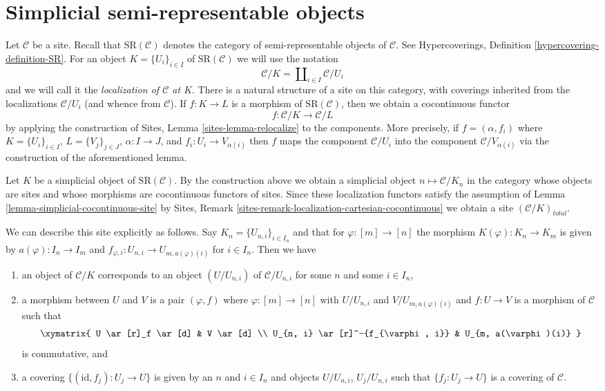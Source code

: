 \section{Simplicial semi-representable objects}
\label{section-semi-representable}

\noindent
Let $\mathcal{C}$ be a site. Recall that $\text{SR}(\mathcal{C})$
denotes the category of semi-representable objects of $\mathcal{C}$.
See Hypercoverings, Definition \ref{hypercovering-definition-SR}.
For an object $K = \{U_i\}_{i \in I}$ of $\text{SR}(\mathcal{C})$
we will use the notation
$$
\mathcal{C}/K = \coprod\nolimits_{i \in I} \mathcal{C}/U_i
$$
and we will call it the {\it localization of $\mathcal{C}$ at $K$}.
There is a natural structure of a site on this category, with
coverings inherited from the localizations $\mathcal{C}/U_i$
(and whence from $\mathcal{C}$). If $f : K \to L$ is a morphism of
$\text{SR}(\mathcal{C})$, then we obtain a cocontinuous functor
$$
f : \mathcal{C}/K \longrightarrow \mathcal{C}/L
$$
by applying the construction of Sites, Lemma \ref{sites-lemma-relocalize}
to the components. More precisely, if $f = (\alpha, f_i)$
where $K = \{U_i\}_{i \in I}$, $L = \{V_j\}_{j \in J}$, $\alpha : I \to J$,
and $f_i : U_i \to V_{\alpha(i)}$ then $f$ maps the component
$\mathcal{C}/U_i$ into the component $\mathcal{C}/V_{\alpha(i)}$
via the construction of the aforementioned lemma.
 
\medskip\noindent
Let $K$ be a simplicial object of $\text{SR}(\mathcal{C})$.
By the construction above we obtain a simplicial object
$n \mapsto \mathcal{C}/K_n$ in the category
whose objects are sites and whose morphisms are cocontinuous
functors of sites. Since these localization functors satisfy the assumption
of Lemma \ref{lemma-simplicial-cocontinuous-site} by
Sites, Remark \ref{sites-remark-localization-cartesian-cocontinuous}
we obtain a site $(\mathcal{C}/K)_{total}$.

\medskip\noindent
We can describe this site explicitly as follows. Say
$K_n = \{U_{n, i}\}_{i \in I_n}$ and that for $\varphi : [m] \to [n]$
the morphism $K(\varphi) : K_n \to K_m$ is given by
$a(\varphi) : I_n \to I_m$ and
$f_{\varphi, i} : U_{n, i} \to U_{m, a(\varphi)(i)}$ for $i \in I_n$.
Then we have
\begin{enumerate}
\item an object of $\mathcal{C}/K$ corresponds to an object $(U/U_{n, i})$
of $\mathcal{C}/U_{n, i}$ for some $n$ and some $i \in I_n$,
\item a morphism between $U$ and $V$ is a pair $(\varphi, f)$
where $\varphi : [m] \to [n]$ with $U/U_{n, i}$ and
$V/U_{m, a(\varphi)(i)}$ and $f : U \to V$ is a morphism of $\mathcal{C}$
such that
$$
\xymatrix{
U \ar[r]_f \ar[d] & V \ar[d] \\
U_{n, i} \ar[r]^-{f_{\varphi, i}} & U_{m, a(\varphi)(i)}
}
$$
is commutative, and
\item a covering $\{(\text{id}, f_j) : U_j \to U\}$ is given by
an $n$ and $i \in I_n$ and objects $U/U_{n, i}$, $U_j/U_{n, i}$
such that $\{f_j  : U_j \to U\}$ is a covering of $\mathcal{C}$.
\end{enumerate}

